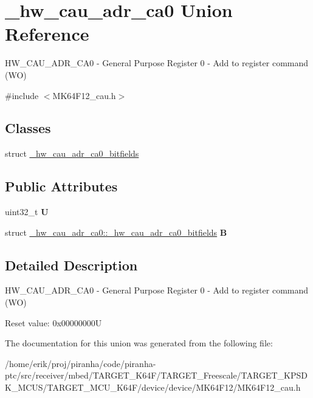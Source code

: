 \hypertarget{union__hw__cau__adr__ca0}{}\section{\+\_\+hw\+\_\+cau\+\_\+adr\+\_\+ca0 Union Reference}
\label{union__hw__cau__adr__ca0}


H\+W\+\_\+\+C\+A\+U\+\_\+\+A\+D\+R\+\_\+\+C\+A0 -\/ General Purpose Register 0 -\/ Add to register command (WO)  




{\ttfamily \#include $<$M\+K64\+F12\+\_\+cau.\+h$>$}

\subsection*{Classes}
\begin{DoxyCompactItemize}
\item 
struct \hyperlink{struct__hw__cau__adr__ca0_1_1__hw__cau__adr__ca0__bitfields}{\+\_\+hw\+\_\+cau\+\_\+adr\+\_\+ca0\+\_\+bitfields}
\end{DoxyCompactItemize}
\subsection*{Public Attributes}
\begin{DoxyCompactItemize}
\item 
uint32\+\_\+t {\bfseries U}\hypertarget{union__hw__cau__adr__ca0_aaa4badc3b50a67af05afc108f3002648}{}\label{union__hw__cau__adr__ca0_aaa4badc3b50a67af05afc108f3002648}

\item 
struct \hyperlink{struct__hw__cau__adr__ca0_1_1__hw__cau__adr__ca0__bitfields}{\+\_\+hw\+\_\+cau\+\_\+adr\+\_\+ca0\+::\+\_\+hw\+\_\+cau\+\_\+adr\+\_\+ca0\+\_\+bitfields} {\bfseries B}\hypertarget{union__hw__cau__adr__ca0_aa0e645fa451f15ba7fdd33d660f6d2f2}{}\label{union__hw__cau__adr__ca0_aa0e645fa451f15ba7fdd33d660f6d2f2}

\end{DoxyCompactItemize}


\subsection{Detailed Description}
H\+W\+\_\+\+C\+A\+U\+\_\+\+A\+D\+R\+\_\+\+C\+A0 -\/ General Purpose Register 0 -\/ Add to register command (WO) 

Reset value\+: 0x00000000U 

The documentation for this union was generated from the following file\+:\begin{DoxyCompactItemize}
\item 
/home/erik/proj/piranha/code/piranha-\/ptc/src/receiver/mbed/\+T\+A\+R\+G\+E\+T\+\_\+\+K64\+F/\+T\+A\+R\+G\+E\+T\+\_\+\+Freescale/\+T\+A\+R\+G\+E\+T\+\_\+\+K\+P\+S\+D\+K\+\_\+\+M\+C\+U\+S/\+T\+A\+R\+G\+E\+T\+\_\+\+M\+C\+U\+\_\+\+K64\+F/device/device/\+M\+K64\+F12/M\+K64\+F12\+\_\+cau.\+h\end{DoxyCompactItemize}
